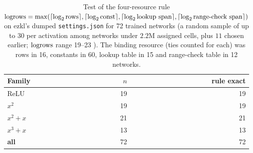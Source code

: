 \begin{table}[h]
\centering
\caption{Test of the four-resource rule $\mathrm{logrows}=\max(\lceil\log_2\text{rows}\rceil,\lceil\log_2\text{const}\rceil,\lceil\log_2\text{lookup span}\rceil,\lceil\log_2\text{range-check span}\rceil)$
  on ezkl's dumped \texttt{settings.json} for 72 trained networks (a random sample of up to $30$ per activation among networks under $2.2$M assigned cells, plus $11$ chosen earlier; $\mathrm{logrows}$ range 19--23 ).  The binding resource (ties counted for each) was
  rows in 16, constants in 60, lookup table in 15 and range-check table in 12 networks.}
\label{tab:accounting}
\small
\begin{tabular}{lrr}
\toprule
\textbf{Family} & $n$ & \textbf{rule exact} \\
\midrule
ReLU & 19 & 19 \\
$x^2$ & 19 & 19 \\
$x^2{+}x$ & 21 & 21 \\
$x^3{+}x$ & 13 & 13 \\
\textbf{all} & 72 & 72 \\
\bottomrule
\end{tabular}
\end{table}
